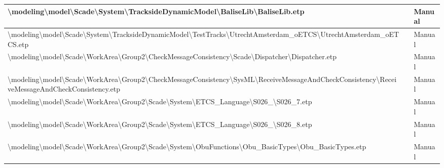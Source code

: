 \begin{longtable}{|>{\RaggedRight}p{}|>{\RaggedRight}p{}|>{\RaggedRight}p{}|}
\hline
\textbackslash modeling\textbackslash \allowbreak model\textbackslash \allowbreak Scade\textbackslash \allowbreak System\textbackslash \allowbreak TracksideDynamicModel\textbackslash \allowbreak BaliseLib\textbackslash \allowbreak BaliseLib.etp& &Manual\\
\hline
\textbackslash modeling\textbackslash \allowbreak model\textbackslash \allowbreak Scade\textbackslash \allowbreak System\textbackslash \allowbreak TracksideDynamicModel\textbackslash \allowbreak TestTracks\textbackslash \allowbreak UtrechtAmsterdam\_\allowbreak oETCS\textbackslash \allowbreak UtrechtAmsterdam\_\allowbreak oETCS.etp& &Manual\\
\hline
\textbackslash modeling\textbackslash \allowbreak model\textbackslash \allowbreak Scade\textbackslash \allowbreak WorkArea\textbackslash \allowbreak Group2\textbackslash \allowbreak CheckMessageConsistency\textbackslash \allowbreak Scade\textbackslash \allowbreak Dispatcher\textbackslash \allowbreak Dispatcher.etp& &Manual\\
\hline
\textbackslash modeling\textbackslash \allowbreak model\textbackslash \allowbreak Scade\textbackslash \allowbreak WorkArea\textbackslash \allowbreak Group2\textbackslash \allowbreak CheckMessageConsistency\textbackslash \allowbreak SysML\textbackslash \allowbreak ReceiveMessageAndCheckConsistency\textbackslash \allowbreak ReceiveMessageAndCheckConsistency.etp& &Manual\\
\hline
\textbackslash modeling\textbackslash \allowbreak model\textbackslash \allowbreak Scade\textbackslash \allowbreak WorkArea\textbackslash \allowbreak Group2\textbackslash \allowbreak Scade\textbackslash \allowbreak System\textbackslash \allowbreak ETCS\_\allowbreak Language\textbackslash \allowbreak S026\_\allowbreak 7\textbackslash \allowbreak S026\_\allowbreak 7.etp& &Manual\\
\hline
\textbackslash modeling\textbackslash \allowbreak model\textbackslash \allowbreak Scade\textbackslash \allowbreak WorkArea\textbackslash \allowbreak Group2\textbackslash \allowbreak Scade\textbackslash \allowbreak System\textbackslash \allowbreak ETCS\_\allowbreak Language\textbackslash \allowbreak S026\_\allowbreak 8\textbackslash \allowbreak S026\_\allowbreak 8.etp& &Manual\\
\hline
\textbackslash modeling\textbackslash \allowbreak model\textbackslash \allowbreak Scade\textbackslash \allowbreak WorkArea\textbackslash \allowbreak Group2\textbackslash \allowbreak Scade\textbackslash \allowbreak System\textbackslash \allowbreak ObuFunctions\textbackslash \allowbreak Obu\_\allowbreak BasicTypes\textbackslash \allowbreak Obu\_\allowbreak BasicTypes.etp& &Manual\\

\end{longtable}
